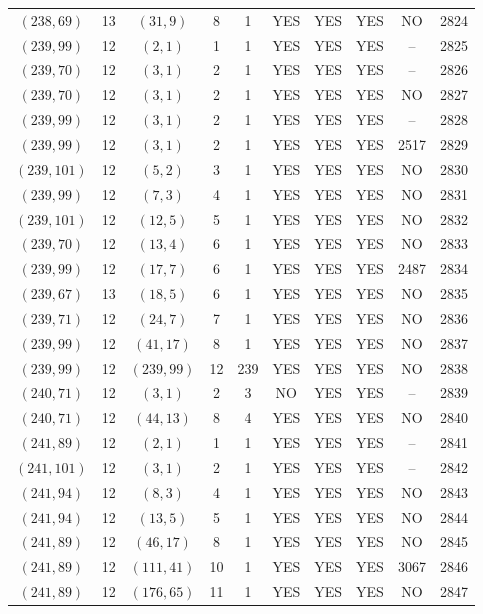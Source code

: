 \begin{longtable}{|c|c|c|c|c|c|c|c|c|c|}
$(238, 69)$ & 13 & $(31, 9)$ & 8 & 1 & YES & YES & YES & NO & 2824\\
$(239, 99)$ & 12 & $(2, 1)$ & 1 & 1 & YES & YES & YES & -- & 2825\\
$(239, 70)$ & 12 & $(3, 1)$ & 2 & 1 & YES & YES & YES & -- & 2826\\
$(239, 70)$ & 12 & $(3, 1)$ & 2 & 1 & YES & YES & YES & NO & 2827\\
$(239, 99)$ & 12 & $(3, 1)$ & 2 & 1 & YES & YES & YES & -- & 2828\\
$(239, 99)$ & 12 & $(3, 1)$ & 2 & 1 & YES & YES & YES & 2517 & 2829\\
$(239, 101)$ & 12 & $(5, 2)$ & 3 & 1 & YES & YES & YES & NO & 2830\\
$(239, 99)$ & 12 & $(7, 3)$ & 4 & 1 & YES & YES & YES & NO & 2831\\
$(239, 101)$ & 12 & $(12, 5)$ & 5 & 1 & YES & YES & YES & NO & 2832\\
$(239, 70)$ & 12 & $(13, 4)$ & 6 & 1 & YES & YES & YES & NO & 2833\\
$(239, 99)$ & 12 & $(17, 7)$ & 6 & 1 & YES & YES & YES & 2487 & 2834\\
$(239, 67)$ & 13 & $(18, 5)$ & 6 & 1 & YES & YES & YES & NO & 2835\\
$(239, 71)$ & 12 & $(24, 7)$ & 7 & 1 & YES & YES & YES & NO & 2836\\
$(239, 99)$ & 12 & $(41, 17)$ & 8 & 1 & YES & YES & YES & NO & 2837\\
$(239, 99)$ & 12 & $(239, 99)$ & 12 & 239 & YES & YES & YES & NO & 2838\\
$(240, 71)$ & 12 & $(3, 1)$ & 2 & 3 & NO & YES & YES & -- & 2839\\
$(240, 71)$ & 12 & $(44, 13)$ & 8 & 4 & YES & YES & YES & NO & 2840\\
$(241, 89)$ & 12 & $(2, 1)$ & 1 & 1 & YES & YES & YES & -- & 2841\\
$(241, 101)$ & 12 & $(3, 1)$ & 2 & 1 & YES & YES & YES & -- & 2842\\
$(241, 94)$ & 12 & $(8, 3)$ & 4 & 1 & YES & YES & YES & NO & 2843\\
$(241, 94)$ & 12 & $(13, 5)$ & 5 & 1 & YES & YES & YES & NO & 2844\\
$(241, 89)$ & 12 & $(46, 17)$ & 8 & 1 & YES & YES & YES & NO & 2845\\
$(241, 89)$ & 12 & $(111, 41)$ & 10 & 1 & YES & YES & YES & 3067 & 2846\\
$(241, 89)$ & 12 & $(176, 65)$ & 11 & 1 & YES & YES & YES & NO & 2847\\

\end{longtable}
